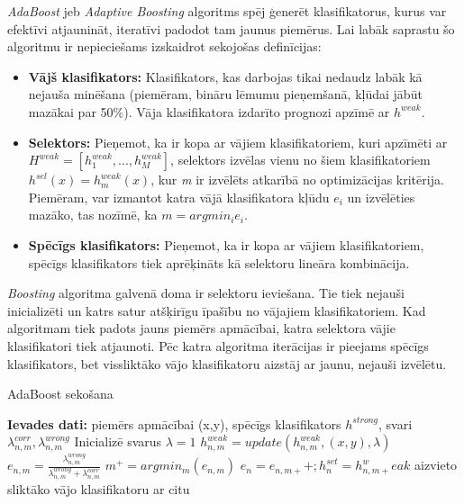 \textit{AdaBoost} jeb \textit{Adaptive Boosting} algoritms spēj ģenerēt klasifikatorus, kurus var efektīvi atjaunināt, iteratīvi padodot tam jaunus piemērus. Lai labāk saprastu šo algoritmu ir nepieciešams izskaidrot sekojošas definīcijas:
\begin{itemize}
	\item \textbf{Vājš klasifikators:} Klasifikators, kas darbojas tikai nedaudz labāk kā nejauša minēšana (piemēram, bināru lēmumu pieņemšanā, kļūdai jābūt mazākai par 50\%). Vāja klasifikatora izdarīto prognozi apzīmē ar $h^{weak}$.
	\item \textbf{Selektors:} Pieņemot, ka ir kopa ar vājiem klasifikatoriem, kuri apzīmēti ar $H^{weak} = [h^{weak}_1,...,h^{weak}_M]$, selektors izvēlas vienu no šiem klasifikatoriem $h^{sel}(x) = h^{weak}_m(x)$, kur \textit{m} ir izvēlēts atkarībā no optimizācijas kritērija. Piemēram, var izmantot katra vājā klasifikatora kļūdu $e_i$ un izvēlēties mazāko, tas nozīmē, ka $m = argmin_ie_i$.
	\item \textbf{Spēcīgs klasifikators:} Pieņemot, ka ir kopa ar vājiem klasifikatoriem, spēcīgs klasifikators tiek aprēķināts kā selektoru lineāra kombinācija. 
\end{itemize}

\textit{Boosting} algoritma galvenā doma ir selektoru ieviešana. Tie tiek nejauši inicializēti un katrs satur atšķirīgu īpašību no vājajiem klasifikatoriem. Kad algoritmam tiek padots jauns piemērs apmācībai, katra selektora vājie klasifikatori tiek atjaunoti. Pēc katra algoritma iterācijas ir pieejams spēcīgs klasifikators, bet vissliktāko vājo klasifikatoru aizstāj ar jaunu, nejauši izvēlētu.

\begin{algorithm}
	\caption{AdaBoost sekošana}\label{euclid}
	\begin{algorithmic}[1]
		\item[\textbf{Ievades dati:}] piemērs apmācībai (x,y), spēcīgs klasifikators $h^{strong}$, svari $\lambda_{n,m}^{corr}, \lambda_{n,m}^{wrong}$
		\State Inicializē svarus $\lambda = 1$
		\State $h_{n,m}^{weak} = update(h_{n,m}^{weak},(x,y),\lambda)$
		   
		\EndIf
		\State $e_{n,m} = \frac{\lambda_{n,m}^{wrong}}{\lambda_{n,m}^{wrong} + \lambda_{n,m}^{corr}}$
		\EndFor
		\State $m^+ = arg min_m(e_{n,m})$ 
		\State $e_n = e_{n,m+} +; h_n^{set} = h_{n,m+}^weak$
		 
		\EndIf
		  
		\EndIf
		 \Comment aizvieto sliktāko vājo klasifikatoru ar citu
		\EndFor
	\end{algorithmic}
\end{algorithm}